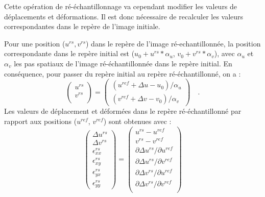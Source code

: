 \documentclass[
	a4paper, %
	10pt, %
	twoside, %
	french
]{LTJournalArticle}
\begin{document}
Cette opération de ré-échantillonnage va cependant modifier les valeurs de déplacements et déformations.
Il est donc nécessaire de recalculer les valeurs correspondantes dans le repère de l'image initiale.

Pour une position ($u^{rs}, v^{rs}$) dans le repère de l'image ré-echantillonnée, la position correspondante dans le repère initial est ($u_0 + u^{rs}*\alpha_u$, $v_0 + v^{rs}*\alpha_v$), avec $\alpha_u$ et $\alpha_v$ les pas spatiaux de l'image ré-échantillonnée dans le repère initial.
En conséquence, pour passer du repère initial au repère ré-échantillonné, on a :
\begin{equation}
	\left(
		\begin{array}{l}
			u^{rs} \\
			v^{rs} \\
		\end{array}
	\right)
	=
	\left(
		\begin{array}{l}
			(u^{ref} + \Delta u - u_0) / \alpha_u\\
			(v^{ref} + \Delta v - v_0) / \alpha_v
		\end{array}
	\right) \quad .
\end{equation}
Les valeurs de déplacement et déformées dans le repère ré-échantillonné par rapport aux positions ($u^{ref}$, $v^{ref}$) sont obtenues avec :
\begin{equation}
	\left(
		\begin{array}{c}
			\Delta u^{rs}\\
			\Delta v^{rs}\\
			\epsilon_{xx}^{rs}\\
			\epsilon_{xy}^{rs}\\
			\epsilon_{yx}^{rs}\\
			\epsilon_{yy}^{rs}
		\end{array}
	\right)
	=
	\left(
		\begin{array}{c}
			u^{rs} - u^{ref}\\
			v^{rs} - v^{ref}\\
			\partial \Delta u^{rs} / \partial u^{ref}\\
			\partial \Delta u^{rs} / \partial v^{ref}\\
			\partial \Delta v^{rs} / \partial u^{ref}\\
			\partial \Delta v^{rs} / \partial v^{ref}\\
		\end{array}
	\right)
\end{equation}
\end{document}
